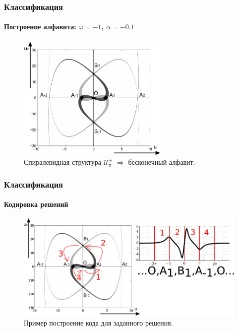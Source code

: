 \documentclass [10pt] {beamer}
\begin{document}
\begin{frame}
	\frametitle{Классификация}
	\framesubtitle{Построение алфавита: $\omega = -1$, $\alpha = -0.1$}
	\begin{figure}
		\includegraphics[width=0.65\textwidth]{pic/alphabet.pdf}
		\caption{Спиралевидная структура $\mathscr{U}_{\pi}^{\pm}$ $\Rightarrow$ бесконечный алфавит.}
		\label{pic:alphabet}
	\end{figure}
\end{frame}

\begin{frame}
	\frametitle{Классификация}
	\framesubtitle{Кодировка решений}
	
	\begin{figure}
		\includegraphics[width=1\textwidth]{pic/coding.pdf}
		\caption{Пример построение кода для заданного решения.}
		\label{pic:coding}
	\end{figure}
\end{frame}
\end{document}
